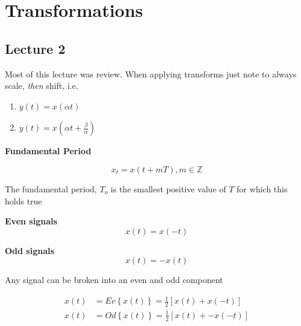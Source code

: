 \documentclass[10pt]{article}
\begin{document}
\section{Transformations}

\subsection{Lecture 2}
Most of this lecture was review. When applying transforms just note to always scale, \textit{then} shift, i.e.

\begin{enumerate}
	\item $ y(t) = x(\alpha t) $ 
	\item $ y(t) = x(\alpha t+\frac{\beta}{\alpha}) $ 
\end{enumerate}


\begin{definition}
	\textbf{Fundamental Period} 


	\begin{equation}
		x_t = x(t+ mT), m \in \mathbb{Z}
		\label{eq:355:fundamental_period}
	\end{equation}

	The fundamental period, $ T_o $  is the smallest positive value of $ T $ for which this holds true
\end{definition}

\begin{definition}
	\textbf{Even signals} 
	\begin{equation}
		x(t) = x(-t)
		\label{eq:355:even_signal}
	\end{equation}
\end{definition}

\begin{definition}
	\textbf{Odd signals} 
	\begin{equation}
		x(t) = -x(t)
		\label{eq:355:odd_signal}
	\end{equation}
\end{definition}


\begin{theorem}
	Any signal can be broken into an even and odd component

	\begin{equation}
		\begin{split}
			x(t) &= Ev \left\{ x(t) \right\} = \frac{1}{2} \left[ x(t) + x(-t) \right]  \\
			x(t) &= Od \left\{ x(t) \right\} = \frac{1}{2} \left[ x(t) + -x(-t) \right]  \\
		\end{split}
		\label{eq:355:even_odd_decomposition}
	\end{equation}
\end{theorem}
\end{document}
